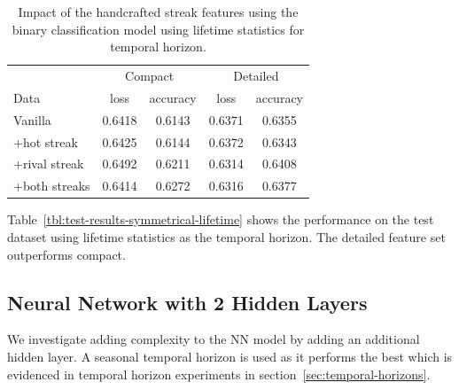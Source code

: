 \documentclass{article} %
\begin{document}
\begin{table}
\centering
  \begin{tabular}{|l|c|c|c|c|}
  \hline
   & \multicolumn{2}{|c|}{Compact} & \multicolumn{2}{|c|}{Detailed}\\
  Data & loss & accuracy & loss & accuracy\\
  \hline
  Vanilla       & 0.6418 & 0.6143 & 0.6371 & 0.6355\\ 
  +hot streak   & 0.6425 & 0.6144 & 0.6372 & 0.6343\\
  +rival streak & 0.6492 & 0.6211 & 0.6314 & 0.6408\\
  +both streaks & 0.6414 & 0.6272 & 0.6316 & 0.6377\\
  \hline
  \end{tabular}
  \caption{Impact of the handcrafted streak features using the binary classification model using lifetime statistics for temporal horizon.}
\end{table}
\label{tbl:test-results-symmetrical-lifetime}

Table~\ref{tbl:test-results-symmetrical-lifetime} shows the performance on the test dataset using lifetime statistics as the temporal horizon.
The detailed feature set outperforms compact.


\subsection{Neural Network with 2 Hidden Layers}

We investigate adding complexity to the NN model by adding an additional hidden layer.
A seasonal temporal horizon is used as it performs the best which is evidenced in temporal horizon experiments in section~\ref{sec:temporal-horizons}.
\end{document}
